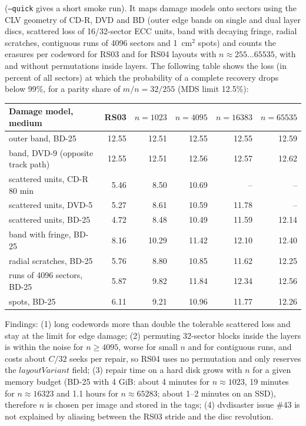 ({\tt --quick} gives a short smoke run). It maps damage models onto sectors using the
CLV geometry of CD-R, DVD and BD (outer edge bands on single and dual layer
discs, scattered loss of 16/32-sector ECC units, band with decaying fringe,
radial scratches, contiguous runs of 4096 sectors and 1~cm$^2$ spots) and
counts the erasures per codeword for RS03 and for RS04 layouts with
$n \approx 255 \ldots 65535$, with and without permutations inside layers.
The following table shows the loss (in percent of all sectors) at which the
probability of a complete recovery drops below 99\%, for a parity share of
$m/n = 32/255$ (MDS limit 12.5\%):

\medskip
{\small
\begin{tabular}{|l|r|r|r|r|r|}
\hline
Damage model, medium & RS03 & $n=1023$ & $n=4095$ & $n=16383$ & $n=65535$ \\
\hline
outer band, BD-25 & 12.55 & 12.51 & 12.55 & 12.55 & 12.59 \\
band, DVD-9 (opposite track path) & 12.55 & 12.51 & 12.56 & 12.57 & 12.62 \\
scattered units, CD-R 80 min & 5.46 & 8.50 & 10.69 & -- & -- \\
scattered units, DVD-5 & 5.27 & 8.61 & 10.59 & 11.78 & -- \\
scattered units, BD-25 & 4.72 & 8.48 & 10.49 & 11.59 & 12.14 \\
band with fringe, BD-25 & 8.16 & 10.29 & 11.42 & 12.10 & 12.40 \\
radial scratches, BD-25 & 5.76 & 8.80 & 10.85 & 11.62 & 12.25 \\
runs of 4096 sectors, BD-25 & 5.87 & 9.82 & 11.84 & 12.34 & 12.56 \\
spots, BD-25 & 6.11 & 9.21 & 10.96 & 11.77 & 12.26 \\
\hline
\end{tabular}
}
\medskip

Findings: (1) long codewords more than double the tolerable scattered loss
and stay at the limit for edge damage; (2) permuting 32-sector blocks inside
the layers is within the noise for $n \ge 4095$, worse for small $n$ and
for contiguous runs, and costs about $C/32$ seeks per repair, so RS04 uses
no permutation and only reserves the $layoutVariant$ field; (3) repair time
on a hard disk grows with $n$ for a given memory budget (BD-25 with 4 GiB:
about 4 minutes for $n \approx 1023$, 19 minutes for $n \approx 16323$ and
1.1 hours for $n \approx 65283$; about 1--2 minutes on an SSD), therefore
$n$ is chosen per image and stored in the tags; (4) dvdisaster issue \#43
is not explained by aliasing between the RS03 stride and the disc
revolution.

